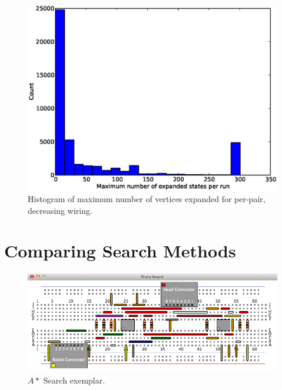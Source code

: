 \begin{figure}[H]
\begin{center}
\includegraphics[width=\textwidth]{Images/max_expanded_per_pair_decreasing.eps}
\caption{Histogram of maximum number of vertices expanded for per-pair,
decreasing wiring.}
\label{fig:max_expanded_per_pair_decreasing}
\end{center}
\end{figure}

\section{Comparing Search Methods}

\begin{figure}[H]
\begin{center}
\includegraphics[width=\textwidth]{Images/exemplar_per_pair_decreasing.png}
\caption{$A*$ Search exemplar.}
\end{center}
\end{figure}

